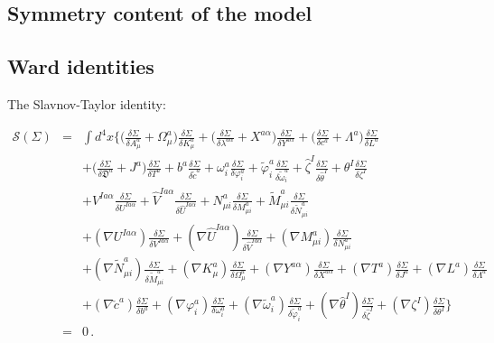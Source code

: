 \begin{appendix}
\section{Symmetry content of the model}


\subsection*{Ward identities}
\begin{itemize}
{\item The Slavnov-Taylor identity:}

\begin{eqnarray}
\mathcal{S}(\Sigma) &=& \int d^{4}x \biggl\{\biggl(\frac{\delta \Sigma}{\delta A^{a}_{\mu}}
+ \Omega^{a}_{\mu}\biggr)\frac{\delta \Sigma}{\delta K^{a}_{\mu}}
+ \biggl(\frac{\delta \Sigma}{\delta \lambda^{a\alpha}}
+ X^{a\alpha}\biggr)\frac{\delta \Sigma}{\delta Y^{a\alpha}}
+\biggl(\frac{\delta \Sigma}{\delta c^{a}}
+ \Lambda^{a}\biggr)\frac{\delta \Sigma}{\delta L^{a}} \nonumber \\
&&
+ \biggl(\frac{\delta \Sigma}{\delta \mathfrak{D}^{a}}
+ {J}^{a}\biggr)\frac{\delta \Sigma}{\delta T^{a}}
+ b^{a}\frac{\delta \Sigma}{\delta \check{c}^{a}}
+ \omega^{a}_{i}\frac{\delta \Sigma}{\delta \varphi^{a}_{i}}
+ \tilde{\varphi}^{a}_{i}\frac{\delta \Sigma}{\delta \tilde{\omega}^{a}_{i}}
+ \hat{\zeta}^{I}\frac{\delta \Sigma}{\delta \hat{\theta}^{I}}
+ \theta^{I}\frac{\delta \Sigma}{\delta \zeta^{I}}\nonumber \\
&&
+{V}^{Ia\alpha}\frac{\delta \Sigma}{\delta {U}^{Ia\alpha}}
+ \hat{V}^{Ia\alpha}\frac{\delta \Sigma}{\delta \hat{U}^{Ia\alpha}}
+ {N}^{a}_{\mu i}\frac{\delta \Sigma}{\delta{M}^{a}_{\mu i}}
+ \tilde{M}^{a}_{\mu i}\frac{\delta \Sigma}{\delta \tilde{N}^{a}_{\mu i}} \nonumber  \\
&&
+(\nabla{U}^{Ia\alpha})\frac{\delta \Sigma}{\delta{V}^{Ia\alpha}}
+(\nabla\hat{U}^{Ia\alpha})\frac{\delta \Sigma}{\delta \hat{V}^{Ia\alpha}}
+(\nabla{M}^{a}_{\mu i})\frac{\delta \Sigma}{\delta {N}^{a}_{\mu i}} \nonumber \\
&&
+(\nabla\tilde{N}^{a}_{\mu i})\frac{\delta \Sigma}{\delta \tilde{M}^{a}_{\mu i}}
+(\nabla K^{a}_{\mu})\frac{\delta \Sigma}{\delta \Omega^{a}_{\mu}}
+(\nabla Y^{a\alpha})\frac{\delta \Sigma}{\delta {X}^{a\alpha}}
+(\nabla T^{a})\frac{\delta \Sigma}{\delta {J}^{a}}
+(\nabla L^{a})\frac{\delta \Sigma}{\delta {\Lambda}^{a}}\nonumber  \\
&&
+(\nabla \check{c}^{a})\frac{\delta \Sigma}{\delta b^{a}}
+(\nabla\varphi^{a}_{i})\frac{\delta \Sigma}{\delta \omega^{a}_{i}}
+(\nabla\tilde{\omega}^{a}_{i})\frac{\delta \Sigma}{\delta \tilde{\varphi}^{a}_{i}}
+(\nabla\hat{\theta}^{I})\frac{\delta \Sigma}{\delta \hat{\zeta}^{I}}
+(\nabla\zeta^{I})\frac{\delta \Sigma}{\delta \theta^{I}}  \biggr\}\nonumber\\
&=& 0\,.
\label{ST1}
\end{eqnarray}


\end{itemize}
\end{appendix}
